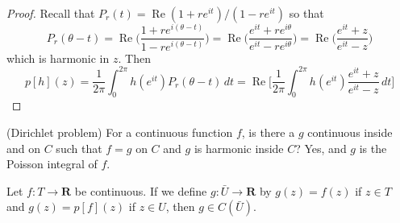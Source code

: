 \vspace{2ex}
\begin{proof}
Recall that $P_{r}(t)=\mathop{\mathrm{Re}}(1+re^{it})/(1-re^{it})$ so that
\[P_{r}(\theta -t)=\mathop{\mathrm{Re}}\Big(\dfrac{1+re^{i(\theta -t)}}{1-re^{i(\theta -t)}}\Big)=\mathop{\mathrm{Re}}\Big(\dfrac{e^{it}+re^{i\theta }}{e^{it}-re^{i\theta }}\Big)=\mathop{\mathrm{Re}}\Big(\dfrac{e^{it}+z}{e^{it}-z}\Big)\]
which is harmonic in $z$. Then
\[p[h](z)=\dfrac{1}{2\pi }\int ^{2\pi }_{0}h(e^{it})P_{r}(\theta -t)\,dt=\mathop{\mathrm{Re}}\Big[\dfrac{1}{2\pi }\int ^{2\pi }_{0}h(e^{it})\dfrac{e^{it}+z}{e^{it}-z}\,dt\Big]\]
\end{proof}
\vspace{2ex}
\begin{defi}
(Dirichlet problem) For a continuous function $f$, is there a $g$ continuous inside and on $C$ such that $f=g$ on $C$ and $g$ is harmonic inside $C$? Yes, and $g$ is the Poisson integral of $f$. 
\end{defi}
\vspace{2ex}
\begin{thm}
Let $f:T\rightarrow {\bm R}$ be continuous. If we define $g:\bar{U}\rightarrow {\bm R}$ by $g(z)=f(z)$ if $z\in T$ and $g(z)=p[f](z)$ if $z\in U$, then $g\in C(\bar{U})$.
\end{thm}
\vspace{2ex}

